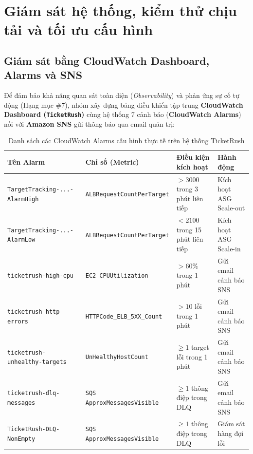 \chapter[Giám sát và kiểm thử chịu tải]{Giám sát hệ thống, kiểm thử chịu tải và tối ưu cấu hình}

\section{Giám sát bằng CloudWatch Dashboard, Alarms và SNS}
Để đảm bảo khả năng quan sát toàn diện (\textit{Observability}) và phản ứng sự cố tự động (Hạng mục \#7), nhóm xây dựng bảng điều khiển tập trung \textbf{CloudWatch Dashboard (\texttt{TicketRush})} cùng hệ thống 7 cảnh báo (\textbf{CloudWatch Alarms}) nối với \textbf{Amazon SNS} gửi thông báo qua email quản trị:

\begin{table}[H]
  \centering
  \scriptsize
  \renewcommand{\arraystretch}{1.25}
  \begin{tabularx}{\textwidth}{>{\raggedright\arraybackslash}p{4.3cm} >{\raggedright\arraybackslash}p{3.9cm} >{\raggedright\arraybackslash}X >{\raggedright\arraybackslash}p{2.7cm}}
    \toprule
    \textbf{Tên Alarm} & \textbf{Chỉ số (Metric)} & \textbf{Điều kiện kích hoạt} & \textbf{Hành động} \\
    \midrule
    \texttt{TargetTracking-...-AlarmHigh} & \texttt{ALBRequestCountPerTarget} & $> 3000$ trong 3 phút liên tiếp & Kích hoạt ASG Scale-out \\
    \texttt{TargetTracking-...-AlarmLow} & \texttt{ALBRequestCountPerTarget} & $< 2100$ trong 15 phút liên tiếp & Kích hoạt ASG Scale-in \\
    \texttt{ticketrush-high-cpu} & \texttt{EC2 CPUUtilization} & $> 60\%$ trong 1 phút & Gửi email cảnh báo SNS \\
    \texttt{ticketrush-http-errors} & \texttt{HTTPCode\_ELB\_5XX\_Count} & $> 10$ lỗi trong 1 phút & Gửi email cảnh báo SNS \\
    \texttt{ticketrush-unhealthy-targets} & \texttt{UnHealthyHostCount} & $\ge 1$ target lỗi trong 1 phút & Gửi email cảnh báo SNS \\
    \texttt{ticketrush-dlq-messages} & \texttt{SQS ApproxMessagesVisible} & $\ge 1$ thông điệp trong DLQ & Gửi email cảnh báo SNS \\
    \texttt{TicketRush-DLQ-NonEmpty} & \texttt{SQS ApproxMessagesVisible} & $\ge 1$ thông điệp trong DLQ & Giám sát hàng đợi lỗi \\
    \bottomrule
  \end{tabularx}
  \caption{Danh sách các CloudWatch Alarms cấu hình thực tế trên hệ thống TicketRush}
  \label{tab:alarms}
\end{table}

